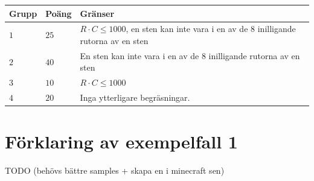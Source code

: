 \noindent
\begin{tabular}{| l | l | p{12cm} |}
  \hline
  \textbf{Grupp} & \textbf{Poäng} & \textbf{Gränser} \\ \hline
  $1$    & $25$      & $R \cdot C \le 1000$, en sten kan inte vara i en av de $8$ inilligande rutorna av en sten \\ \hline
  $2$    & $40$      & En sten kan inte vara i en av de $8$ inilligande rutorna av en sten \\ \hline
  $3$    & $10$      & $R \cdot C \le 1000$ \\ \hline
  $4$    & $20$      & Inga ytterligare begräsningar. \\ \hline
\end{tabular}

\section*{Förklaring av exempelfall 1}
TODO (behövs bättre samples + skapa en i minecraft sen)